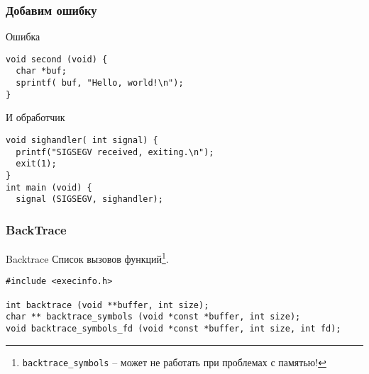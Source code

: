 %
%
%
%

\begin{frame}[fragile]
	\frametitle{Добавим ошибку}

	\begin{block}{Ошибка}
	
	\begin{lstlisting}
void second (void) {
  char *buf;
  sprintf( buf, "Hello, world!\n");
}
	\end{lstlisting}
	\end{block}
	
	\pause

	\begin{block}{И обработчик}
	\begin{lstlisting}
void sighandler( int signal) {
  printf("SIGSEGV received, exiting.\n");
  exit(1);
}
int main (void) {
  signal (SIGSEGV, sighandler);
	\end{lstlisting}
	\end{block}

\end{frame}



\begin{frame}[fragile]
	\frametitle{BackTrace}

	\begin{block}{Backtrace}
		Список вызовов функций\footnote{{\tt backtrace\_symbols} -- может не работать при проблемах с памятью!}.

	\end{block}

	\begin{lstlisting}
#include <execinfo.h>

int backtrace (void **buffer, int size);
char ** backtrace_symbols (void *const *buffer, int size);
void backtrace_symbols_fd (void *const *buffer, int size, int fd);
	\end{lstlisting}
\end{frame}

